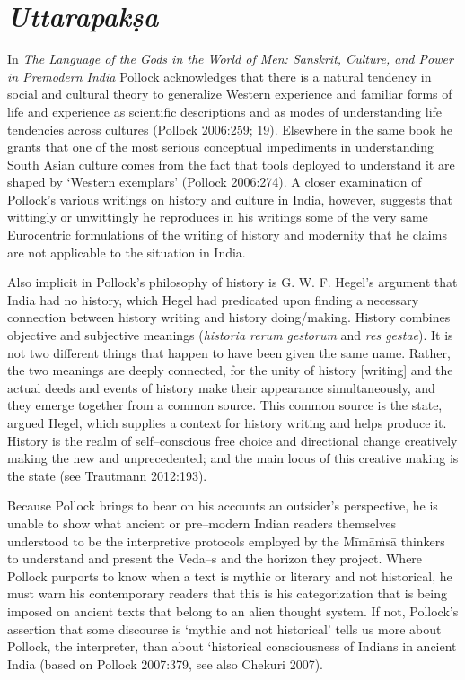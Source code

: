 \section*{\textit{Uttarapakṣa}}

In \textit{The Language of the Gods in the World of Men: Sanskrit, Culture, and Power in Premodern India} Pollock acknowledges that there is a natural tendency in social and cultural theory to generalize Western experience and familiar forms of life and experience as scientific descriptions and as modes of understanding life tendencies across cultures (Pollock 2006:259; 19). Elsewhere in the same book he grants that one of the most serious conceptual impediments in understanding South Asian culture comes from the fact that tools deployed to understand it are shaped by ‘Western exemplars’ (Pollock 2006:274). A closer examination of Pollock’s various writings on history and culture in India, however, suggests that wittingly or unwittingly he reproduces in his writings some of the very same Eurocentric formulations of the writing of history and modernity that he claims are not applicable to the situation in India.

Also implicit in Pollock’s philosophy of history is G. W. F. Hegel’s argument that India had no history, which Hegel had predicated upon finding a necessary connection between history writing and history doing/making. History combines objective and subjective meanings (\textit{historia rerum gestorum} and \textit{res gestae}). It is not two different things that happen to have been given the same name. Rather, the two meanings are deeply connected, for the unity of history [writing] and the actual deeds and events of history make their appearance simultaneously, and they emerge together from a common source. This common source is the state, argued Hegel, which supplies a context for history writing and helps produce it. History is the realm of self–conscious free choice and directional change creatively making the new and unprecedented; and the main locus of this creative making is the state (see Trautmann 2012:193).

Because Pollock brings to bear on his accounts an outsider’s perspective, he is unable to show what ancient or pre–modern Indian readers themselves understood to be the interpretive protocols employed by the Mīmāṁsā thinkers to understand and present the Veda–s and the horizon they project. Where Pollock purports to know when a text is mythic or literary and not historical, he must warn his contemporary readers that this is his categorization that is being imposed on ancient texts that belong to an alien thought system. If not, Pollock’s assertion that some discourse is ‘mythic and not historical’ tells us more about Pollock, the interpreter, than about ‘historical consciousness of Indians in ancient India (based on Pollock 2007:379, see also Chekuri 2007).

